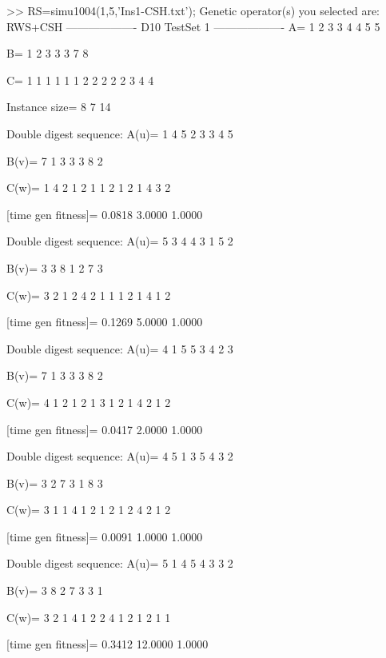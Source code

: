 >> RS=simu1004(1,5,'Ins1-CSH.txt');
Genetic operator(s) you selected are:
RWS+CSH
------------------- D10 TestSet 1 -------------------
A=
     1     2     3     3     4     4     5     5

B=
     1     2     3     3     3     7     8

C=
     1     1     1     1     1     1     2     2     2     2     2     3     4     4

Instance size=
     8     7    14

Double digest sequence:
A(u)=
     1     4     5     2     3     3     4     5

B(v)=
     7     1     3     3     3     8     2

C(w)=
     1     4     2     1     2     1     1     2     1     2     1     4     3     2

[time gen fitness]=
    0.0818    3.0000    1.0000

Double digest sequence:
A(u)=
     5     3     4     4     3     1     5     2

B(v)=
     3     3     8     1     2     7     3

C(w)=
     3     2     1     2     4     2     1     1     1     2     1     4     1     2

[time gen fitness]=
    0.1269    5.0000    1.0000

Double digest sequence:
A(u)=
     4     1     5     5     3     4     2     3

B(v)=
     7     1     3     3     3     8     2

C(w)=
     4     1     2     1     2     1     3     1     2     1     4     2     1     2

[time gen fitness]=
    0.0417    2.0000    1.0000

Double digest sequence:
A(u)=
     4     5     1     3     5     4     3     2

B(v)=
     3     2     7     3     1     8     3

C(w)=
     3     1     1     4     1     2     1     2     1     2     4     2     1     2

[time gen fitness]=
    0.0091    1.0000    1.0000

Double digest sequence:
A(u)=
     5     1     4     5     4     3     3     2

B(v)=
     3     8     2     7     3     3     1

C(w)=
     3     2     1     4     1     2     2     4     1     2     1     2     1     1

[time gen fitness]=
    0.3412   12.0000    1.0000

